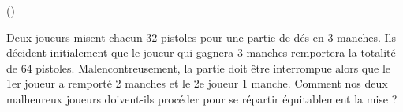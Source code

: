 \begin{exercice}\label{exo3-1} (\coolexo)

Deux joueurs misent chacun 32 pistoles pour une partie de d\'es en 3 manches. Ils d\'ecident initialement que le joueur qui gagnera 3 manches remportera la totalit\'e de 64 pistoles. 
Malencontreusement, la partie doit \^etre interrompue alors que le 1er joueur a remport\'e 2 manches et le 2e joueur 1 manche. Comment nos deux malheureux joueurs doivent-ils proc\'eder pour se r\'epartir \'equitablement la mise ?\\

\end{exercice}
